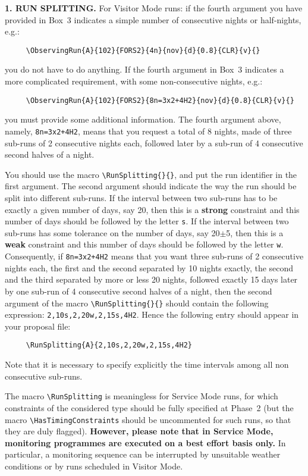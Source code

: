 \documentclass{article}
\begin{document}
\medskip

{\bf 1. RUN SPLITTING.} For Visitor Mode runs: if the fourth argument
you have provided in 
Box~3 indicates a simple number of consecutive nights or half-nights,
e.g.:
\begin{verbatim}
     \ObservingRun{A}{102}{FORS2}{4n}{nov}{d}{0.8}{CLR}{v}{}
\end{verbatim}
you do not have to do anything.  If the fourth argument in Box~3
indicates a more complicated requirement, with some non-consecutive
nights, e.g.: 
\begin{verbatim}
     \ObservingRun{A}{102}{FORS2}{8n=3x2+4H2}{nov}{d}{0.8}{CLR}{v}{}
\end{verbatim}
you must provide some additional information.  The fourth argument above,
namely, \verb|8n=3x2+4H2|, means that you request a total of 8 nights,
made of three sub-runs of 2 consecutive nights each, followed later by
a sub-run of 4 consecutive second halves of a night.

You should use the macro \verb|\RunSplitting{}{}|, and put
the run identifier in the first argument.  The second argument should indicate
the way the run should be split into different sub-runs.  If the
interval between two sub-runs has to be exactly a given number of
days, say 20, then this is a {\bf strong} constraint and this number
of days should be followed by the letter \verb|s|.  If the interval
between two sub-runs has some tolerance on the number of days, say
20$\pm$5, then this is a {\bf weak} constraint and this number of days
should be followed by the letter \verb|w|.  Consequently, if
\verb|8n=3x2+4H2| means that you want three sub-runs of 2 consecutive
nights each, the first and the second separated by 10 nights exactly,
the second and the third separated by more or less 20 nights, followed
exactly 15 days later by one sub-run of 4 consecutive second halves of
a night, then the second argument of the macro
\verb|\RunSplitting{}{}| should contain the following expression:
\verb|2,10s,2,20w,2,15s,4H2|. Hence the following entry should appear
in your proposal file:
\begin{verbatim}
     \RunSplitting{A}{2,10s,2,20w,2,15s,4H2}
\end{verbatim}

Note that it is necessary to specify explicitly the time intervals
among all non consecutive sub-runs.

The macro \verb|\RunSplitting| is meaningless for Service Mode runs,
for which constraints of the considered type should be fully specified
at Phase~2 (but the macro \verb|\HasTimingConstraints| should be
uncommented for such runs, so that they are duly flagged). {\bf
However, please note that in Service Mode, 
monitoring programmes are executed on a best effort 
basis only.} In particular, a monitoring sequence can be interrupted
by unsuitable weather conditions or by runs scheduled in Visitor Mode.
\end{document}
